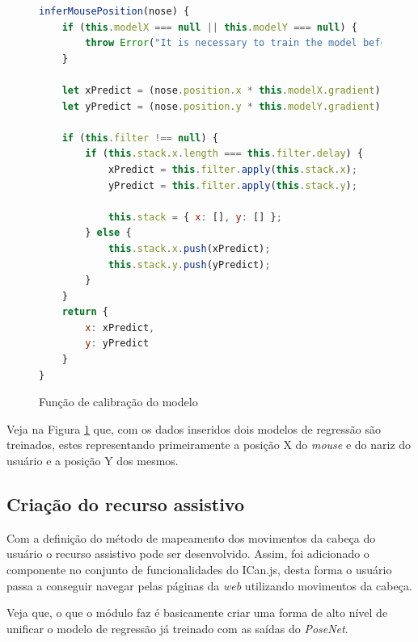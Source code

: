 \begin{figure}[H]
    \centering
    \begin{lstlisting}[language=JavaScript]
inferMousePosition(nose) {
    if (this.modelX === null || this.modelY === null) {
        throw Error("It is necessary to train the model before using this method");
    }

    let xPredict = (nose.position.x * this.modelX.gradient) + this.modelX.intercept;
    let yPredict = (nose.position.y * this.modelY.gradient) + this.modelY.intercept;

    if (this.filter !== null) {
        if (this.stack.x.length === this.filter.delay) {
            xPredict = this.filter.apply(this.stack.x);
            yPredict = this.filter.apply(this.stack.y);

            this.stack = { x: [], y: [] };
        } else {
            this.stack.x.push(xPredict);
            this.stack.y.push(yPredict);
        }
    }
    return {
        x: xPredict,
        y: yPredict
    }
}
    \end{lstlisting}
    \caption{Função de calibração do modelo}
    \label{figure:funcao_calibracao_modelo_de_regressao}
\end{figure}

\par Veja na Figura \ref{figure:funcao_calibracao_modelo_de_regressao} que, com os dados inseridos dois modelos de regressão são treinados, estes representando primeiramente a posição X do \textit{mouse} e do nariz do usuário e a posição Y dos mesmos.

\subsection{Criação do recurso assistivo}

\par Com a definição do método de mapeamento dos movimentos da cabeça do usuário o recurso assistivo pode ser desenvolvido. Assim, foi adicionado o componente  no conjunto de funcionalidades  do ICan.js, desta forma o usuário passa a conseguir navegar pelas páginas da \textit{web} utilizando movimentos da cabeça.

\par Veja que, o que o módulo  faz é basicamente criar uma forma de alto nível de unificar o modelo de regressão já treinado com as saídas do \textit{PoseNet}.
